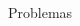 \documentclass[t,%
brazilian,%
11pt,%
aspectratio=169,%
table%
]{beamer}
\begin{document}
\begin{frame}{Problemas}
\begin{columns}[T]
\begin{column}{0.45\textwidth}
        \end{column}
    \end{columns}
\end{frame}
\end{document}
